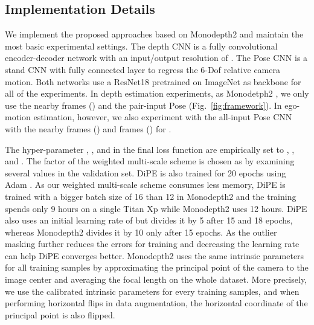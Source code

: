 \documentclass[letterpaper, 10 pt, conference]{ieeeconf}
\begin{document}
\subsection{Implementation Details}
We implement the proposed approaches based on Monodepth2 \cite{godard2019digging} and maintain the most basic experimental settings. 
The depth CNN is a fully convolutional encoder-decoder network with an input/output resolution of . The Pose CNN is a stand CNN with fully connected layer to regress the 6-Dof relative camera motion. 
Both networks use a ResNet18 \cite{he2016deep} pretrained on ImageNet \cite{deng2009imagenet} as backbone for all of the experiments.
In depth estimation experiments, as Monodetph2 \cite{godard2019digging}, we only use the nearby  frames () and the pair-input Pose (Fig.~\ref{fig:framework}). In ego-motion estimation, however, we also experiment with the all-input Pose CNN with the nearby  frames  () and  frames () for \cite{zhou2017unsupervised, mahjourian2018unsupervised}.
 

The hyper-parameter , , and  in the final loss function are empirically set to , , and . The factor  of the weighted multi-scale scheme is chosen as  by examining several values in the validation set. 
DiPE is also trained for 20 epochs using Adam \cite{kingma2014adam}. As our weighted multi-scale scheme consumes less memory, DiPE is trained with a bigger batch size of 16 than 12 in Monodepth2 and the training spends only 9 hours on a single Titan Xp while Monodepth2 uses 12 hours. DiPE also uses an initial learning rate of   but divides it by 5 after 15 and 18 epochs, whereas Monodepth2 divides it by 10 only after 15 epochs. As the outlier masking further reduces the errors for training and decreasing the learning rate can help DiPE converges better. 
Monodepth2 uses the same intrinsic parameters for all training samples by approximating the principal point of the camera to the image center and averaging the focal length on the whole dataset. More precisely, we use the calibrated intrinsic parameters for every training samples, and when performing horizontal flips in data augmentation, the horizontal coordinate of the principal point is also flipped. 
\end{document}
